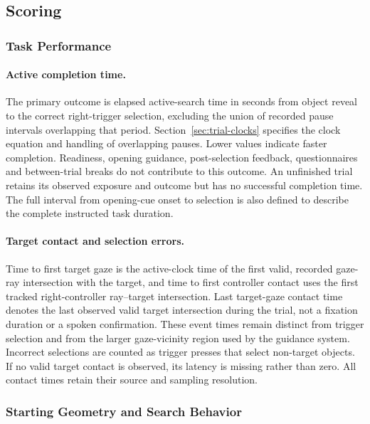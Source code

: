 \subsection{Scoring}
\label{sec:scoring}
\subsubsection{Task Performance}
\paragraph{Active completion time.} The primary outcome is elapsed active-search time in seconds from object reveal to the correct right-trigger selection, excluding the union of recorded pause intervals overlapping that period. Section~\ref{sec:trial-clocks} specifies the clock equation and handling of overlapping pauses. Lower values indicate faster completion. Readiness, opening guidance, post-selection feedback, questionnaires and between-trial breaks do not contribute to this outcome. An unfinished trial retains its observed exposure and outcome but has no successful completion time. The full interval from opening-cue onset to selection is also defined to describe the complete instructed task duration.

\paragraph{Target contact and selection errors.} Time to first target gaze is the active-clock time of the first valid, recorded gaze-ray intersection with the target, and time to first controller contact uses the first tracked right-controller ray--target intersection. Last target-gaze contact time denotes the last observed valid target intersection during the trial, not a fixation duration or a spoken confirmation. These event times remain distinct from trigger selection and from the larger gaze-vicinity region used by the guidance system. Incorrect selections are counted as trigger presses that select non-target objects. If no valid target contact is observed, its latency is missing rather than zero. All contact times retain their source and sampling resolution.

\subsubsection{Starting Geometry and Search Behavior}
